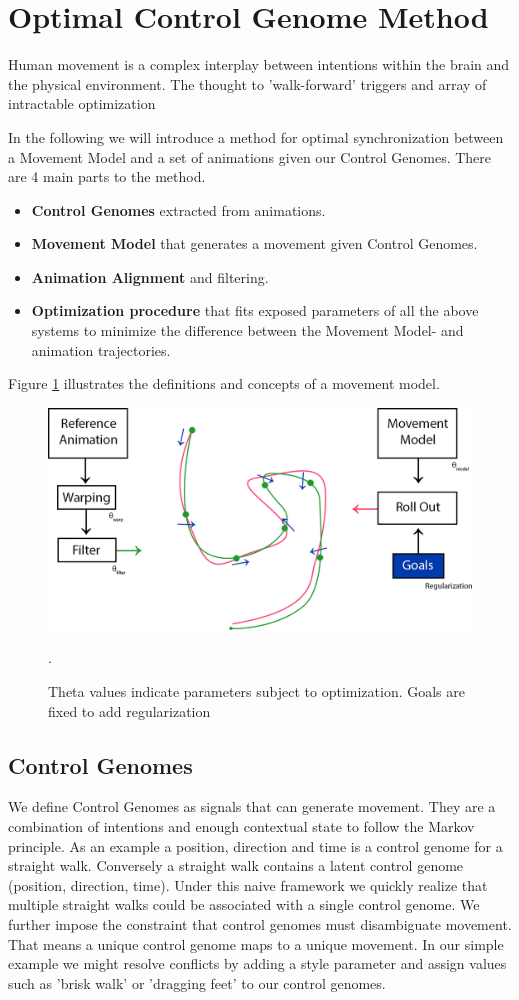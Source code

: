 \section{Optimal Control Genome Method}
Human movement is a complex interplay between intentions within the brain and the physical environment. The thought to 'walk-forward' triggers and array of intractable optimization  

In the following we will introduce a method for optimal synchronization between a Movement Model and a set of animations given our Control Genomes. There are 4 main parts to the method. 
\begin{itemize}
    \item \textbf{Control Genomes} extracted from animations.
    \item \textbf{Movement Model} that generates a movement given Control Genomes.
    \item \textbf{Animation Alignment} and filtering. 
    \item \textbf{Optimization procedure} that fits exposed parameters of all the above systems to minimize the difference between the Movement Model- and animation trajectories.
\end{itemize}
Figure \ref{fig:movement:model} illustrates the definitions and concepts of a movement model.
\begin{figure}
    \centering
    \includegraphics[width=0.75\linewidth]{img/method-overview.png}
    \caption{Theta values indicate parameters subject to optimization. Goals are fixed to add regularization}.
    \label{fig:movement:model}
\end{figure}

\subsection{Control Genomes}
We define Control Genomes as signals that can generate movement. They are a combination of intentions and enough contextual state to follow the Markov principle. As an example a position, direction and time is a control genome for a straight walk. Conversely a straight walk contains a latent control genome (position, direction, time). Under this naive framework we quickly realize that multiple straight walks could be associated with a single control genome. We further impose the constraint that control genomes must disambiguate movement. That means a unique control genome maps to a unique movement. In our simple example we might resolve conflicts by adding a style parameter and assign values such as 'brisk walk' or 'dragging feet' to our control genomes. 


